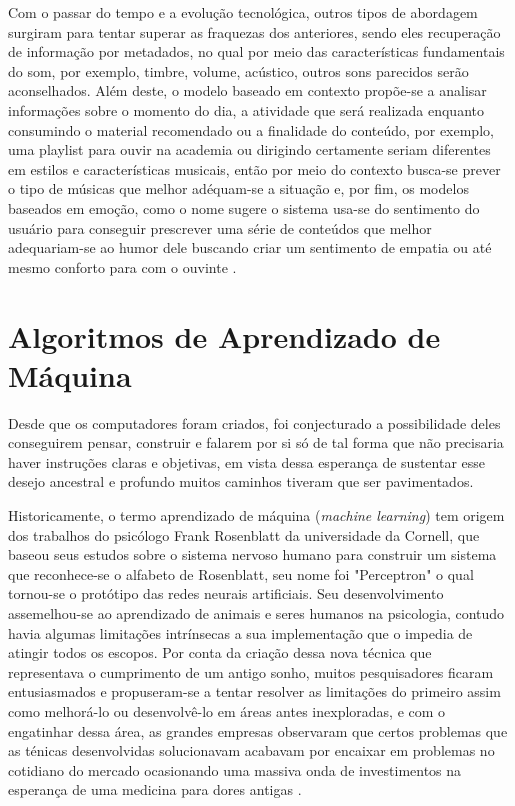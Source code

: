 \documentclass[12pt, %
openright, 
oneside, %
a4paper,    %
brazil]{facom-ufu-abntex2}
\begin{document}
Com o passar do tempo e a evolução tecnológica, outros tipos de abordagem surgiram para tentar superar as fraquezas dos anteriores, sendo eles recuperação de informação por metadados, no qual por meio das características fundamentais do som, por exemplo, timbre, volume, acústico, outros sons parecidos serão aconselhados. Além deste, o modelo baseado em contexto propõe-se a analisar informações sobre o momento do dia, a atividade que será realizada enquanto consumindo o material recomendado ou a finalidade do conteúdo, por exemplo, uma playlist para ouvir na academia ou dirigindo certamente seriam diferentes em estilos e características musicais, então por meio do contexto busca-se prever o tipo de músicas que melhor adéquam-se a situação e, por fim, os modelos baseados em emoção, como o nome sugere o sistema usa-se do sentimento do usuário para conseguir prescrever uma série de conteúdos que melhor adequariam-se ao humor dele buscando criar um sentimento de empatia ou até mesmo conforto para com o ouvinte \cite{song2012survey}.

\section{Algoritmos de Aprendizado de Máquina}


Desde que os computadores foram criados, foi conjecturado a possibilidade deles conseguirem pensar, construir e falarem por si só de tal forma que não precisaria haver instruções claras e objetivas, em vista dessa esperança de sustentar esse desejo ancestral e profundo muitos caminhos tiveram que ser pavimentados.

Historicamente, o termo aprendizado de máquina (\textit{machine learning}) tem origem dos trabalhos do psicólogo Frank Rosenblatt da universidade da Cornell, que baseou seus estudos sobre o sistema nervoso humano para construir um sistema que reconhece-se o alfabeto de Rosenblatt, seu nome foi "Perceptron" o qual tornou-se o protótipo das redes neurais artificiais. Seu desenvolvimento assemelhou-se ao aprendizado de animais e seres humanos na psicologia, contudo havia algumas limitações intrínsecas a sua implementação que o impedia de atingir todos os escopos. Por conta da criação dessa nova técnica que representava o cumprimento de um antigo sonho, muitos pesquisadores ficaram entusiasmados e propuseram-se a tentar resolver as limitações do primeiro assim como melhorá-lo ou desenvolvê-lo em áreas antes inexploradas, e com o engatinhar dessa área, as grandes empresas observaram que certos problemas que as ténicas desenvolvidas solucionavam acabavam por encaixar em problemas no cotidiano do mercado ocasionando uma massiva onda de investimentos na esperança de uma medicina para dores antigas \cite{fradkov2020early}.
\end{document}
